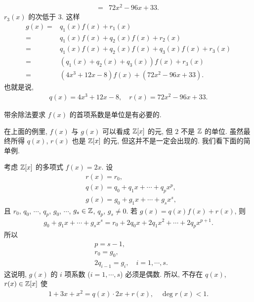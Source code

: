 \begin{example}
\begin{align*}
        = {} & 72x^2 - 96x + 33.
    \end{align*}
    $r_3 (x)$ 的次低于 $3$. 这样
    \begin{align*}
        g(x)
        = {} & q_1 (x) f(x) + r_1 (x)                               \\
        = {} & q_1 (x) f(x) + q_2 (x) f(x) + r_2 (x)                \\
        = {} & q_1 (x) f(x) + q_2 (x) f(x) + q_3 (x) f(x) + r_3 (x) \\
        = {} & (q_1 (x) + q_2 (x) + q_3 (x)) f(x) + r_3 (x)         \\
        = {} & (4x^3 + 12x - 8) f(x) + (72x^2 - 96x + 33).
    \end{align*}
    也就是说,
    \begin{align*}
        q(x) = 4x^3 + 12x - 8, \quad r(x) = 72x^2 - 96x + 33.
    \end{align*}
\end{example}

\begin{remark}
    带余除法要求 $f(x)$ 的首项系数是单位是有必要的.

    在上面的例里, $f(x)$ 与 $g(x)$ 可以看成 $\mathbb{Z}[x]$ 的元, 但 $2$ 不是 $\mathbb{Z}$ 的单位. 虽然最终所得 $q(x)$, $r(x)$ 也是 $\mathbb{Z}[x]$ 的元, 但这并不是一定会出现的. 我们看下面的简单例.

    考虑 $\mathbb{Z}[x]$ 的多项式 $f(x)=2x$. 设
    \begin{align*}
         & r(x) = r_0,                            \\
         & q(x) = q_0 + q_1 x + \cdots + q_p x^p, \\
         & g(x) = g_0 + g_1 x + \cdots + g_s x^s,
    \end{align*}
    且 $r_0$, $q_0$, $\cdots$, $q_p$, $g_0$, $\cdots$, $g_s \in \mathbb{Z}$, $q_p$, $g_s \neq 0$. 若 $g(x) = q(x)f(x) + r(x)$, 则
    \begin{align*}
        g_0 + g_1 x + \cdots + g_s x^s = r_0 + 2q_0 x + 2q_1 x^2 + \cdots + 2q_p x^{p+1}.
    \end{align*}
    所以
    \begin{align*}
         & p = s - 1,                          \\
         & r_0 = g_0,                          \\
         & 2q_{i-1} = g_i, \quad i=1,\cdots,s.
    \end{align*}
    这说明, $g(x)$ 的 $i$ 项系数 ($i=1,\cdots,s$) 必须是偶数. 所以, 不存在 $q(x)$, $r(x) \in \mathbb{Z}[x]$ 使
    \begin{align*}
        1 + 3x + x^2 = q(x) \cdot 2x + r(x), \quad \deg r(x) < 1.
    \end{align*}
\end{remark}

